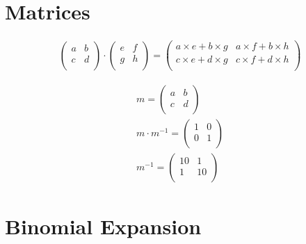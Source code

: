 \documentclass{article}
\begin{document}
\section{Matrices}

\begin{gather*}
	\begin{pmatrix}
		a & b \\
		c & d \\
	\end{pmatrix} \cdot \begin{pmatrix}
		e & f \\
		g & h \\
	\end{pmatrix} = \begin{pmatrix}
		a \times e + b \times g & a \times f + b \times h \\
		c \times e + d \times g & c \times f + d \times h \\
	\end{pmatrix}
\end{gather*}

\begin{gather*}
	m = \begin{pmatrix}
		a & b \\
		c & d \\
	\end{pmatrix}\\
	m \cdot m^{-1} = \begin{pmatrix}
		1 & 0 \\
		0 & 1 \\
	\end{pmatrix}\\
	m^{-1} = \begin{pmatrix}
		10 & 1 \\
		1 & 10 \\
	\end{pmatrix}
\end{gather*}


\section{Binomial Expansion}
\end{document}
